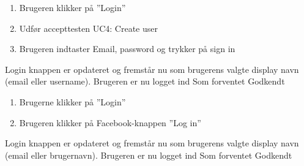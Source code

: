

		{
		\begin{enumerate}
			\item Brugeren klikker på ''Login''
			\item Udfør accepttesten UC4: Create user
			\item Brugeren indtaster Email, password og trykker på sign in
		\end{enumerate}
		} %
		{Login knappen er opdateret og fremstår nu som brugerens valgte display navn (email eller username). Brugeren er nu logget ind} %
		{Som forventet} %
		{Godkendt} %

		{
		\begin{enumerate}
			\item Brugerne klikker på ''Login''
			\item Brugeren klikker på Facebook-knappen ''Log in''
		\end{enumerate}
		} %
		{Login knappen er opdateret og fremstår nu som brugerens valgte display navn (email eller brugernavn). Brugeren er nu logget ind} %
		{Som forventet} %
		{Godkendt} %

